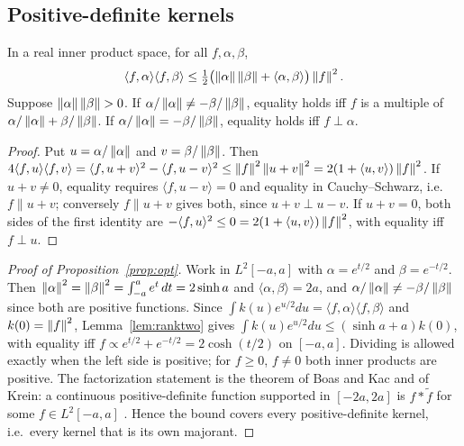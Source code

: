 \subsection{Positive-definite kernels}
\begin{lemma}\label{lem:ranktwo}
In a real inner product space, for all $f,\alpha,\beta$,
\[
  \langle f,\alpha\rangle\langle f,\beta\rangle\le\tfrac12\bigl(\left\lVert \alpha \right\rVert\left\lVert \beta \right\rVert+\langle\alpha,\beta\rangle\bigr)\left\lVert f \right\rVert^2 .
\]
Suppose $\left\lVert \alpha \right\rVert\left\lVert \beta \right\rVert>0$. If $\alpha/\left\lVert \alpha \right\rVert\ne-\beta/\left\lVert \beta \right\rVert$, equality holds iff $f$ is a multiple of
$\alpha/\left\lVert \alpha \right\rVert+\beta/\left\lVert \beta \right\rVert$. If $\alpha/\left\lVert \alpha \right\rVert=-\beta/\left\lVert \beta \right\rVert$, equality holds iff $f\perp\alpha$.
\end{lemma}
\begin{proof}
Put $u=\alpha/\left\lVert \alpha \right\rVert$ and $v=\beta/\left\lVert \beta \right\rVert$. Then
$4\langle f,u\rangle\langle f,v\rangle=\langle f,u+v\rangle^2-\langle f,u-v\rangle^2\le\left\lVert f \right\rVert^2\left\lVert u+v \right\rVert^2=2(1+\langle u,v\rangle)\left\lVert f \right\rVert^2$.
If $u+v\ne0$, equality requires $\langle f,u-v\rangle=0$ and equality in Cauchy--Schwarz, i.e.\ $f\parallel u+v$; conversely
$f\parallel u+v$ gives both, since $u+v\perp u-v$. If $u+v=0$, both sides of the first identity are
$-\langle f,u\rangle^2\le0=2(1+\langle u,v\rangle)\left\lVert f \right\rVert^2$, with equality iff $f\perp u$.
\end{proof}

\begin{proof}[Proof of Proposition~\ref{prop:opt}]
Work in $L^2[-a,a]$ with $\alpha=e^{t/2}$ and $\beta=e^{-t/2}$. Then $\left\lVert \alpha \right\rVert^2=\left\lVert \beta \right\rVert^2=\int_{-a}^ae^t\,dt=2\sinh a$ and
$\langle\alpha,\beta\rangle=2a$, and $\alpha/\left\lVert \alpha \right\rVert\ne-\beta/\left\lVert \beta \right\rVert$ since both are positive functions. Since
$\int k(u)e^{u/2}du=\langle f,\alpha\rangle\langle f,\beta\rangle$ and $k(0)=\left\lVert f \right\rVert^2$, Lemma~\ref{lem:ranktwo} gives
$\int k(u)e^{u/2}du\le(\sinh a+a)k(0)$, with equality iff $f\propto e^{t/2}+e^{-t/2}=2\cosh(t/2)$ on $[-a,a]$. Dividing is
allowed exactly when the left side is positive; for $f\ge0$, $f\ne0$ both inner products are positive. The factorization statement is the theorem of Boas and Kac
and of Krein: a continuous positive-definite function supported in $[-2a,2a]$ is $f*\tilde f$ for some
$f\in L^2[-a,a]$ \cite{boaskac1945,ehmgneitingrichards2004}. Hence the bound covers every positive-definite
kernel, i.e.\ every kernel that is its own majorant.
\end{proof}

